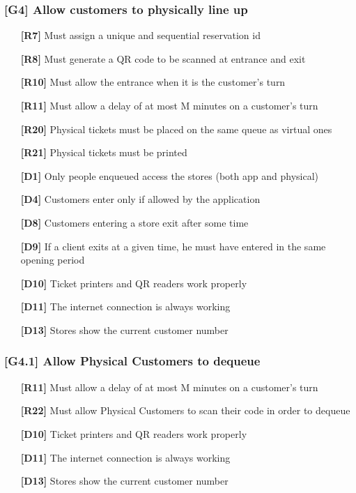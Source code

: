 \subsubsection{[G4] Allow customers to physically line up}
\begin{itemize}
	\setlength\itemsep{-1mm}
	\item [\textbf{[R7]}] Must assign a unique and sequential reservation id
	\item [\textbf{[R8]}] Must generate a QR code to be scanned at entrance and exit
	\item [\textbf{[R10]}] Must allow the entrance when it is the customer’s turn
	\item [\textbf{[R11]}] Must allow a delay of at most M minutes on a customer’s turn
	\item [\textbf{[R20]}] Physical tickets must be placed on the same queue as virtual ones
	\item [\textbf{[R21]}] Physical tickets must be printed
	\\
	\item [\textbf{[D1]}] Only people enqueued access the stores (both app and physical)
	\item [\textbf{[D4]}] Customers enter only if allowed by the application
	\item [\textbf{[D8]}] Customers entering a store exit after some time
	\item [\textbf{[D9]}] If a client exits at a given time, he must have entered in the same opening period
	\item [\textbf{[D10]}] Ticket printers and QR readers work properly
	\item [\textbf{[D11]}] The internet connection is always working
	\item [\textbf{[D13]}] Stores show the current customer number
\end{itemize}

\subsubsection{[G4.1] Allow Physical Customers to dequeue}
\begin{itemize}
	\setlength\itemsep{-1mm}
	\item [\textbf{[R11]}] Must allow a delay of at most M minutes on a customer’s turn
	\item [\textbf{[R22]}] Must allow Physical Customers to scan their code in order to dequeue
	\\
	\item [\textbf{[D10]}] Ticket printers and QR readers work properly
	\item [\textbf{[D11]}] The internet connection is always working
	\item [\textbf{[D13]}] Stores show the current customer number
\end{itemize}

